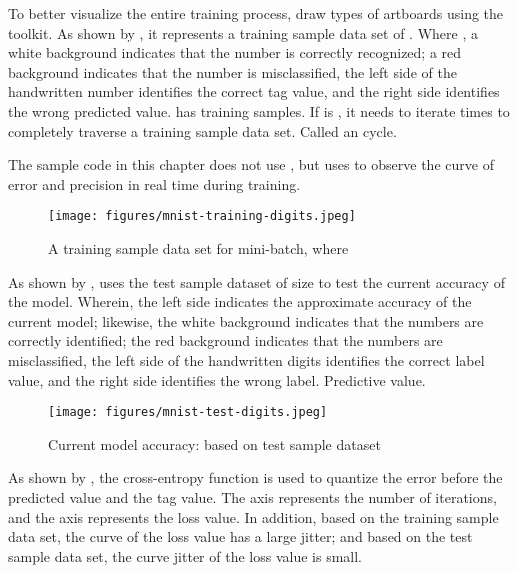 \begin{content}
\begin{content}
To better visualize the entire training process, draw  types of artboards using the  toolkit. As shown by , it represents a training sample data set of . Where , a white background indicates that the number is correctly recognized; a red background indicates that the number is misclassified, the left side of the handwritten number identifies the correct tag value, and the right side identifies the wrong predicted value.
 has  training samples. If  is , it needs to iterate  times to completely traverse a training sample data set. Called an  cycle.

\begin{remark}
The sample code in this chapter does not use , but uses  to observe the curve of error and precision in real time during training.
\end{remark}

\begin{figure}[H]
  \centering
  \texttt{[image: figures/mnist-training-digits.jpeg]}
  \caption{A training sample data set for mini-batch, where }
  \label{fig:mnist-training-digits}
\end{figure}

As shown by ,  uses the test sample dataset of size  to test the current accuracy of the model. Wherein, the left side indicates the approximate accuracy of the current model; likewise, the white background indicates that the numbers are correctly identified; the red background indicates that the numbers are misclassified, the left side of the handwritten digits identifies the correct label value, and the right side identifies the wrong label. Predictive value.

\begin{figure}[H]
  \centering
  \texttt{[image: figures/mnist-test-digits.jpeg]}
  \caption{Current model accuracy: based on test sample dataset}
 \label{fig:mnist-test-digits}
\end{figure}

As shown by , the cross-entropy function is used to quantize the error before the predicted value and the tag value. The  axis represents the number of iterations, and the  axis represents the loss value. In addition, based on the training sample data set, the curve of the loss value has a large jitter; and based on the test sample data set, the curve jitter of the loss value is small.


\end{content}
\end{content}
